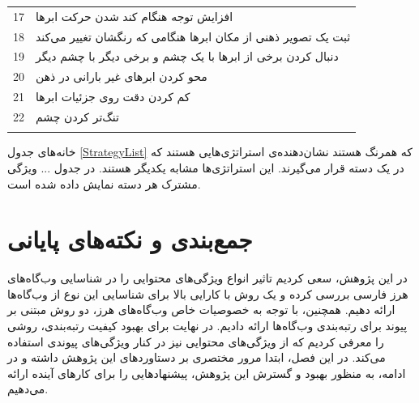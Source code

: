 \documentclass[twoside, a4paper,11pt]{book}
\numberwithin{equation}{chapter}
\numberwithin{table}{chapter}
\numberwithin{figure}{chapter}
\numberwithin{equation}{chapter}
\begin{document}
\begin{table}[]
\begin{tabularx}{\textwidth}{|l|X|}
		\rowcolor{stLightGreen!100}
		17 & افزایش توجه هنگام کند شدن حرکت ابرها \\ \hhline{|-|-|}
		\rowcolor{stLightGreen!100}
		18 & ثبت یک تصویر ذهنی از مکان ابرها هنگامی که رنگشان تغییر می‌کند \\ \hhline{|-|-|}
		\rowcolor{stLightPurple!100}
		19 & دنبال کردن برخی از ابرها با یک چشم و برخی دیگر با چشم دیگر \\ \hhline{|-|-|}
		\rowcolor{stLightPurple!100}
		20 & محو کردن ابرهای غیر بارانی در ذهن \\ \hhline{|-|-|}
		\rowcolor{stLightPurple!100}
		21 & کم کردن دقت روی جزئیات ابرها \\ \hhline{|-|-|}
		\rowcolor{stLightPurple!100}
		22 & تنگ‌تر کردن چشم \\ \hhline{|-|-|}
		
	\end{tabularx}
	
\end{table}

خانه‌های جدول \ref{StrategyList} که همرنگ هستند نشان‌دهنده‌ی استراتژی‌هایی هستند که در یک دسته قرار می‌گیرند. این استراتژی‌ها مشابه یکدیگر هستند. در جدول ... ویژگی مشترک هر دسته نمایش داده شده است.

\chapter{جمع‌بندی و نکته‌های پایانی}
\label{chapter:conclusion}
\thispagestyle{plain}
در این پژوهش، سعی کردیم تاثیر انواع ویژگی‌های محتوایی را در شناسایی وب‌گاه‌های هرز فارسی بررسی کرده و یک روش با کارایی بالا برای شناسایی این نوع از وب‌گاه‌ها ارائه دهیم. همچنین، با توجه به خصوصیات خاص وب‌گاه‌های هرز، دو روش مبتنی بر پیوند برای رتبه‌بندی وب‌گاه‌ها ارائه دادیم. در نهایت برای بهبود کیفیت رتبه‌بندی، روشی را معرفی کردیم که از ویژگی‌های محتوایی نیز در کنار ویژگی‌های پیوندی استفاده می‌کند. در این فصل، ابتدا مرور مختصری بر دستاوردهای این پژوهش داشته و در ادامه، به منظور بهبود و گسترش این پژوهش، پیشنهادهایی را برای کارهای آینده ارائه می‌دهیم. 



\newpage
\thispagestyle{empty}
\mbox{}

\linespread{1}


\small{

\renewcommand{\bibname}{مراجع}
\clearpage

}

\newpage
\thispagestyle{empty}
\mbox{}
\begin{multicols}{2}
\begin{doublespace}

\printglossary[type=latin]

\newpage
\thispagestyle{empty}
\mbox{}

\clearpage
{}
\printglossary[type=persian]
\end{doublespace}
\end{multicols}
\end{document}
